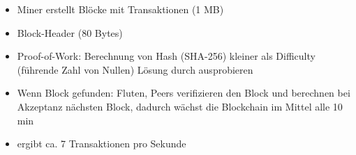 \begin{itemize}
					\begin{itemize}
						\item Miner erstellt Blöcke mit Transaktionen (1 MB)
						\item Block-Header (80 Bytes)
						\item Proof-of-Work: Berechnung von Hash (SHA-256) kleiner als Difficulty (führende Zahl von Nullen) Lösung durch ausprobieren
						\item Wenn Block gefunden: Fluten, Peers verifizieren den Block und berechnen bei Akzeptanz nächsten Block, dadurch wächst die Blockchain im Mittel alle 10 min
						\item ergibt ca. 7 Transaktionen pro Sekunde
					\end{itemize}
			\end{itemize}

				





			
			
			
